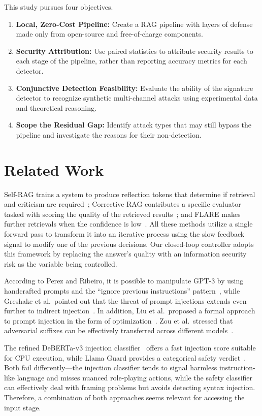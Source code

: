 \documentclass[conference]{IEEEtran}
\begin{document}
This study pursues four objectives.
\begin{enumerate}
\item[(i)] \textbf{Local, Zero-Cost Pipeline:} Create a RAG pipeline with layers of defense made only from open-source and free-of-charge components.
\item[(ii)] \textbf{Security Attribution:} Use paired statistics to attribute security results to each stage of the pipeline, rather than reporting accuracy metrics for each detector.
\item[(iii)] \textbf{Conjunctive Detection Feasibility:} Evaluate the ability of the signature detector to recognize synthetic multi-channel attacks using experimental data and theoretical reasoning.
\item[(iv)] \textbf{Scope the Residual Gap:} Identify attack types that may still bypass the pipeline and investigate the reasons for their non-detection.
\end{enumerate}

\section{Related Work}
Self-RAG trains a system to produce reflection tokens that determine if retrieval and criticism are required~\cite{asai2024selfrag}; Corrective RAG contributes a specific evaluator tasked with scoring the quality of the retrieved results~\cite{yan2024crag}; and FLARE makes further retrievals when the confidence is low~\cite{jiang2023flare}. All these methods utilize a single forward pass to transform it into an iterative process using the slow feedback signal to modify one of the previous decisions. Our closed-loop controller adopts this framework by replacing the answer's quality with an information security risk as the variable being controlled.

According to Perez and Ribeiro, it is possible to manipulate GPT-3 by using handcrafted prompts and the ``ignore previous instructions'' pattern~\cite{perez2022}, while Greshake et al.\ pointed out that the threat of prompt injections extends even further to indirect injection~\cite{greshake2023}. In addition, Liu et al.\ proposed a formal approach to prompt injection in the form of optimization~\cite{liu2024formalizing}. Zou et al.\ stressed that adversarial suffixes can be effectively transferred across different models~\cite{zou2023}.

The refined DeBERTa-v3 injection classifier~\cite{he2021debertav3,protectai2024} offers a fast injection score suitable for CPU execution, while Llama Guard provides a categorical safety verdict~\cite{inan2023llamaguard}. Both fail differently---the injection classifier tends to signal harmless instruction-like language and misses nuanced role-playing actions, while the safety classifier can effectively deal with framing problems but avoids detecting syntax injection. Therefore, a combination of both approaches seems relevant for accessing the input stage.
\end{document}
